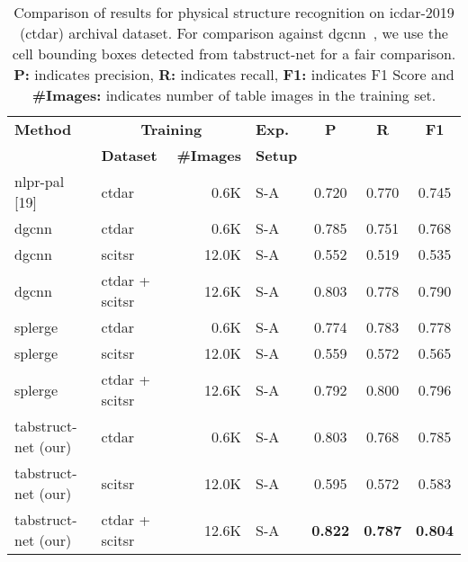 \documentclass[runningheads]{llncs}
\begin{document}
\begin{table}
\begin{center}
\begin{tabular}{|l | l| r| l |c c c|} \hline
\textbf{Method} &\multicolumn{2}{|c|}{\textbf{Training}} &\textbf{Exp.} &\textbf{P} &\textbf{R} &\textbf{F1} \\ \cline{2-3}
  &\textbf{Dataset} &\textbf{\#Images} &\textbf{Setup} & & & \\ \hline
{\sc nlpr-pal} [19] &c{\sc td}a{\sc r} &0.6K &S-A &0.720 &0.770 &0.745 \\ 
{\sc dgcnn}~\cite{qasim2019rethinking} &c{\sc td}a{\sc r} &0.6K &S-A &0.785 &0.751 &0.768 \\
{\sc dgcnn}~\cite{qasim2019rethinking} &{\sc s}ci{\sc tsr} &12.0K &S-A &0.552 &0.519 &0.535 \\
{\sc dgcnn}~\cite{qasim2019rethinking} &c{\sc td}a{\sc r} + {\sc s}ci{\sc tsr} &12.6K &S-A &0.803 &0.778 &0.790 \\
{\sc splerge}~\cite{table_splitting} &c{\sc td}a{\sc r} &0.6K &S-A &0.774 &0.783 &0.778 \\
{\sc splerge}~\cite{table_splitting} &{\sc s}ci{\sc tsr} &12.0K &S-A &0.559 &0.572 &0.565 \\
{\sc splerge}~\cite{table_splitting} &c{\sc td}a{\sc r} + {\sc s}ci{\sc tsr} &12.6K &S-A &0.792 &0.800 &0.796 \\
{\sc t}ab{\sc s}truct-{\sc n}et (our) &c{\sc td}a{\sc r} &0.6K &S-A &0.803 &0.768 &0.785 \\
{\sc t}ab{\sc s}truct-{\sc n}et (our) &{\sc s}ci{\sc tsr} &12.0K &S-A &0.595 &0.572 &0.583 \\
{\sc t}ab{\sc s}truct-{\sc n}et (our) &c{\sc td}a{\sc r} + {\sc s}ci{\sc tsr} &12.6K &S-A &\textbf{0.822} &\textbf{0.787} &\textbf{0.804} \\ \hline 
\end{tabular}
\end{center}
\caption{Comparison of results for physical structure recognition on {\sc icdar}-2019 (c{\sc td}a{\sc r}) archival dataset. For comparison against {\sc dgcnn}~\cite{qasim2019rethinking}, we use the cell bounding boxes detected from {\sc t}ab{\sc s}truct-{\sc n}et for a fair comparison. \textbf{P:} indicates precision, \textbf{R:} indicates recall, \textbf{F1:} indicates F1 Score and \textbf{\#Images:} indicates number of table images in the training set.
\label{table_physical_icdar_2019}}
\end{table}
\end{document}
